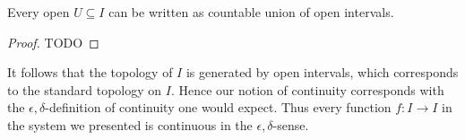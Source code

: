 \begin{lemma}
  Every open $U\subseteq I$ can be written as countable union of open intervals.
\end{lemma} 
\begin{proof}
  TODO
\end{proof}


\begin{remark}
  It follows that the topology of $I$ is generated by open intervals, 
  which corresponds to the standard topology on $I$. 
  Hence our notion of continuity corresponds with the $\epsilon,\delta$-definition of continuity one would expect. 
  Thus every function $f:I\to I$ in the system we presented is continuous in the $\epsilon,\delta$-sense. 
\end{remark}
